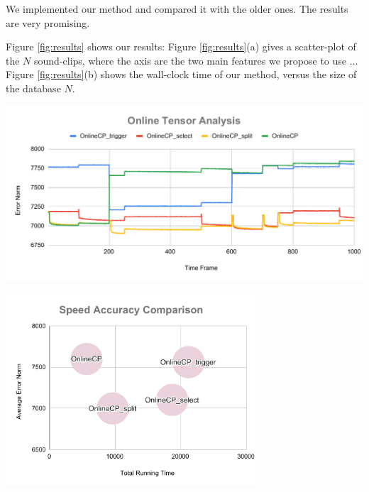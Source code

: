 We implemented our method
and compared it with the older ones.
The results are very promising.

Figure \ref{fig:results} shows our results:
Figure \ref{fig:results}(a) gives a scatter-plot
of the $N$ sound-clips, where the axis are the two main
features we propose to use $\ldots$
Figure \ref{fig:results}(b) shows the wall-clock time
of our method, versus the size of the database $N$.

\begin{center}
	\includegraphics[width=1\textwidth]{FIG/Online Tensor Analysis.pdf}
\end{center}

\begin{center}
	\includegraphics[width=0.7\textwidth]{FIG/Speed Accuracy Comparison.pdf}
\end{center}

